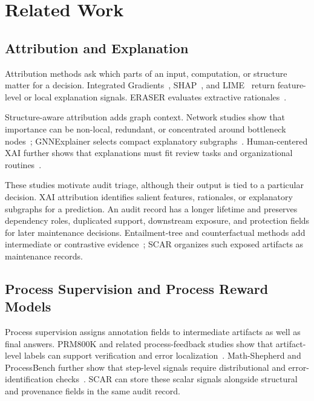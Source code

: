 \documentclass[pdflatex,sn-basic]{sn-jnl}
\begin{document}
\section{Related Work}
\label{sec:related-work}

\subsection{Attribution and Explanation}

Attribution methods ask which parts of an input, computation, or structure matter for a decision. Integrated Gradients~\citep{sundararajan2017axiomatic}, SHAP~\citep{lundberg2017unified}, and LIME~\citep{ribeiro2016lime} return feature-level or local explanation signals. ERASER evaluates extractive rationales~\citep{deyoung2020eraser}.

Structure-aware attribution adds graph context. Network studies show that importance can be non-local, redundant, or concentrated around bottleneck nodes~\citep{albert2000error,newman2010networks}; GNNExplainer selects compact explanatory subgraphs~\citep{ying2019gnnexplainer}. Human-centered XAI further shows that explanations must fit review tasks and organizational routines~\citep{amershi2019guidelines,arrieta2020explainable,kaplan2024xai,miller2019explanation}.

These studies motivate audit triage, although their output is tied to a particular decision. XAI attribution identifies salient features, rationales, or explanatory subgraphs for a prediction. An audit record has a longer lifetime and preserves dependency roles, duplicated support, downstream exposure, and protection fields for later maintenance decisions. Entailment-tree and counterfactual methods add intermediate or contrastive evidence~\citep{dalvi2021entailmenttrees,wijekoon2023counterfactual}; SCAR organizes such exposed artifacts as maintenance records.

\subsection{Process Supervision and Process Reward Models}

Process supervision assigns annotation fields to intermediate artifacts as well as final answers. PRM800K and related process-feedback studies show that artifact-level labels can support verification and error localization~\citep{lightman2023verify,uesato2022solving}. Math-Shepherd and ProcessBench further show that step-level signals require distributional and error-identification checks~\citep{wang2024mathshepherd,zheng2024processbench}. SCAR can store these scalar signals alongside structural and provenance fields in the same audit record.
\end{document}
